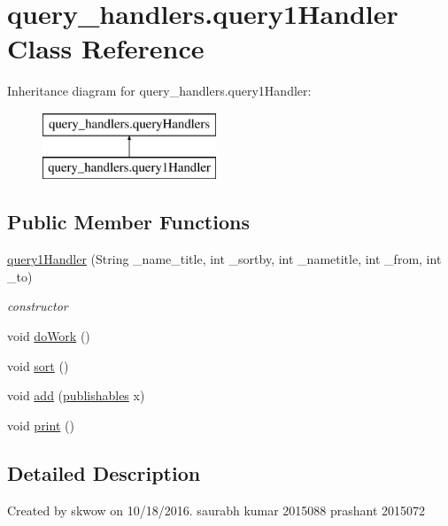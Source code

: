 \hypertarget{classquery__handlers_1_1query1_handler}{}\section{query\+\_\+handlers.\+query1\+Handler Class Reference}
\label{classquery__handlers_1_1query1_handler}
Inheritance diagram for query\+\_\+handlers.\+query1\+Handler\+:\begin{figure}[H]
\begin{center}
\leavevmode
\includegraphics[height=2.000000cm]{classquery__handlers_1_1query1_handler}
\end{center}
\end{figure}
\subsection*{Public Member Functions}
\begin{DoxyCompactItemize}
\item 
\hyperlink{classquery__handlers_1_1query1_handler_a6fe01c044940a164a6c56149fd031131}{query1\+Handler} (String \+\_\+name\+\_\+title, int \+\_\+sortby, int \+\_\+nametitle, int \+\_\+from, int \+\_\+to)
\begin{DoxyCompactList}\small\item\em constructor \end{DoxyCompactList}\item 
void \hyperlink{classquery__handlers_1_1query1_handler_a6e9b752a4ad27626e66dd07bd45661df}{do\+Work} ()
\item 
void \hyperlink{classquery__handlers_1_1query1_handler_ad31be63c673088813821cb1150c8506e}{sort} ()
\item 
void \hyperlink{classquery__handlers_1_1query1_handler_a139b0b15be5b2a7ac0b58a70906fb2a0}{add} (\hyperlink{class_data_1_1publishables}{publishables} x)
\item 
void \hyperlink{classquery__handlers_1_1query1_handler_adb0e49911128d6a1e710cace36a4fae0}{print} ()
\end{DoxyCompactItemize}


\subsection{Detailed Description}
Created by skwow on 10/18/2016. saurabh kumar 2015088 prashant 2015072 

